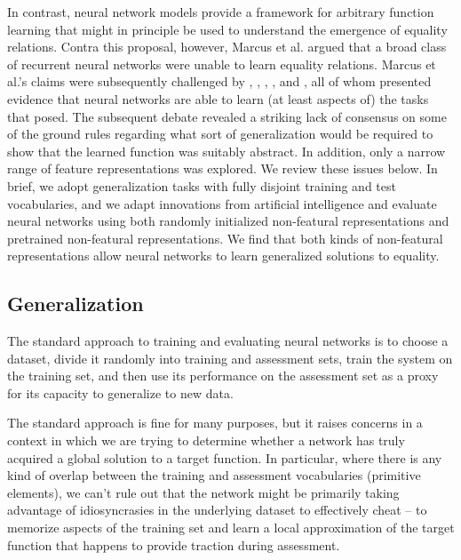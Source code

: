 \documentclass{article}
\newcommand{\updatea}[1]{{\color{darkred}#1}}
\begin{document}
In contrast, neural network models provide a framework for arbitrary function learning that might in principle be used to understand the emergence of equality relations. Contra this proposal, however, Marcus et al. \cite{marcus:1999} argued that a broad class of recurrent neural networks were unable to learn equality relations. Marcus et al.'s \cite{marcus:1999} claims were subsequently challenged by \cite{dienes:1999}, \cite{seidenberg:1999a}, \cite{seidenberg:1999b}, \cite{elman:1999}, and \cite{negishi:1999}, all of whom presented evidence that neural networks are able to learn (at least aspects of) the tasks that \citeauthor{marcus:1999} posed. \updatea{The subsequent debate \citep[reviewed in][]{alhama:2019} revealed a striking lack of consensus on some of the ground rules regarding what sort of generalization would be required to show that the learned function was suitably abstract. In addition, only a narrow range of feature representations was explored. We review these issues below. In brief, we adopt generalization tasks with fully disjoint training and test vocabularies, and we adapt innovations from artificial intelligence and evaluate neural networks using both randomly initialized non-featural representations and pretrained non-featural representations. We find that both kinds of non-featural representations allow neural networks to learn generalized solutions to equality.}


\subsection{Generalization}

The standard approach to training and evaluating neural networks is to choose a dataset, divide it randomly into training and assessment sets, train the system on the training set, and then use its performance on the assessment set as a proxy for its capacity to generalize to new data.

The standard approach is fine for many purposes, but it raises concerns in a context in which we are trying to determine whether a network has truly acquired a global solution to a target function. In particular, where there is any kind of overlap between the training and assessment vocabularies (primitive elements), we can't rule out that the network might be primarily taking advantage of idiosyncrasies in the underlying dataset to effectively cheat -- to memorize aspects of the training set and learn a local approximation of the target function that happens to provide traction during assessment.
\end{document}
